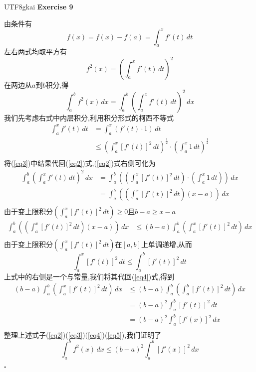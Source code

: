 \documentclass{article}
\newenvironment{exercise}[1]{%
{\textbf{Exercise #1} \\ 
    }
}{
  \hfill $\square$ 
  \par\bigskip 
}
\newcommand{\parameter}[1]{\left(#1\right)}
\begin{document}
\begin{CJK}{UTF8}{gkai}
\begin{exercise}{9}
    由条件有
    \[f(x) = f(x) - f(a) =\int_{a}^{x} f'(t) \, dt\]
    左右两式均取平方有
    \[f^2(x) = \parameter{\int_{a}^{x} f'(t) \, dt}^2\] 
    在两边从$a$到$b$积分,得
    \begin{equation}
        \int_{a}^{b}f^2(x)\, dx = \int_{a}^{b}\parameter{\int_{a}^{x} f'(t) \, dt}^2 \, dx
    \label{eq2}
    \end{equation}
    我们先考虑右式中内层积分,利用积分形式的柯西不等式
    \begin{equation}
        \begin{aligned}
            \int_{a}^{x} f'(t) \, dt &= \int_{a}^{x} (f'(t)\cdot 1) \, dt\\
            &\leq \parameter{\int_{a}^{x} [f'(t)]^2\, dt}^{\frac{1}{2}}\cdot \parameter{\int_{a}^{x} 1\, dt}^{\frac{1}{2}}\\    
            \label{eq3}
        \end{aligned}
    \end{equation}
    将(\ref{eq3})中结果代回(\ref{eq2})式,(\ref{eq2})式右侧可化为
    \begin{equation}
        \begin{aligned}
            \int_{a}^{b}\parameter{\int_{a}^{x} f'(t) \, dt}^2 \, dx &= \int_{a}^{b}\parameter{\parameter{\int_{a}^{x} [f'(t)]^2\, dt} \cdot\parameter{\int_{a}^{x} 1\, dt}}\, dx\\
            &= \int_{a}^{b}\parameter{\parameter{\int_{a}^{x} [f'(t)]^2\, dt} (x - a)}\, dx\\
            \label{eq4}
        \end{aligned}
    \end{equation}
    由于变上限积分$\parameter{\int_{a}^{x} [f'(t)]^2\, dt} \geq 0$且$b - a \geq x - a$
    \[\begin{aligned}
        \int_{a}^{b}\parameter{\parameter{\int_{a}^{x} [f'(t)]^2\, dt} (x - a)}\, dx &\leq (b - a) \int_{a}^{b}\parameter{\int_{a}^{x} [f'(t)]^2\, dt}\, dx\\
    \end{aligned}\]
    由于变上限积分$\parameter{\int_{a}^{x} [f'(t)]^2\, dt}$在$[a,b]$上单调递增,从而
    \[\int_{a}^{x} [f'(t)]^2\, dt \leq \int_{a}^{b} [f'(t)]^2\, dt\]
    上式中的右侧是一个与常量,我们将其代回(\ref{eq4})式,得到
    \begin{equation}
        \begin{aligned}
            (b - a) \int_{a}^{b}\parameter{\int_{a}^{x} [f'(t)]^2\, dt}\, dx &\leq (b - a) \int_{a}^{b}\parameter{\int_{a}^{b} [f'(t)]^2\, dt}\, dx\\
            &= (b - a)^2\int_{a}^{b} [f'(t)]^2\, dt\\
            &= (b - a)^2\int_{a}^{b} [f'(x)]^2\, dx\\
            \label{eq5}
            \end{aligned}
    \end{equation}
    整理上述式子(\ref{eq2})(\ref{eq3})(\ref{eq4})(\ref{eq5}),我们证明了
    \[\int_{a}^{b}f^2(x)\, dx \leq (b - a)^2\int_{a}^{b} [f'(x)]^2\, dx\]
\end{exercise}


\end{CJK}
\end{document}

